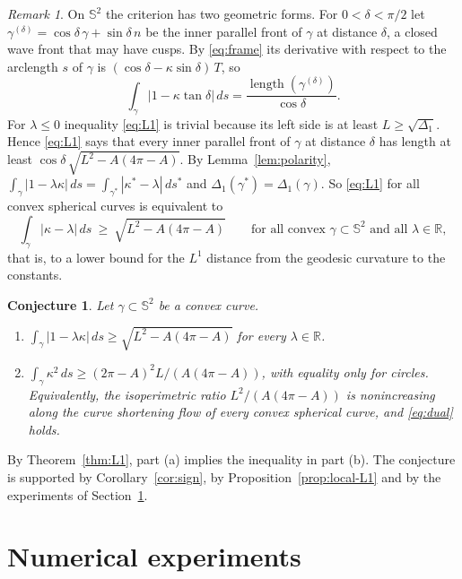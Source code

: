 \documentclass[11pt]{amsart}
\newtheorem{conjecture}[theorem]{Conjecture}
\theoremstyle{definition}
\theoremstyle{remark}
\newtheorem{remark}[theorem]{Remark}
\numberwithin{equation}{section}
\newcommand{\RR}{\mathbb{R}}
\newcommand{\Sph}{\mathbb{S}}
\begin{document}
\begin{remark}\label{rem:fronts}
On $\Sph^2$ the criterion has two geometric forms. For $0<\delta<\pi/2$ let $\gamma^{(\delta)}=\cos\delta\,\gamma+\sin\delta\,n$ be the inner parallel front of $\gamma$ at distance $\delta$, a closed wave front that may have cusps. By \eqref{eq:frame} its derivative with respect to the arclength $s$ of $\gamma$ is $(\cos\delta-\kappa\sin\delta)\,T$, so
\[
\int_\gamma|1-\kappa\tan\delta|\,ds=\frac{\operatorname{length}(\gamma^{(\delta)})}{\cos\delta}.
\]
For $\lambda\le0$ inequality \eqref{eq:L1} is trivial because its left side is at least $L\ge\sqrt{\Delta_1}$. Hence \eqref{eq:L1} says that every inner parallel front of $\gamma$ at distance $\delta$ has length at least $\cos\delta\,\sqrt{L^2-A(4\pi-A)}$. By Lemma~\ref{lem:polarity}, $\int_\gamma|1-\lambda\kappa|\,ds=\int_{\gamma^*}|\kappa^*-\lambda|\,ds^*$ and $\Delta_1(\gamma^*)=\Delta_1(\gamma)$. So \eqref{eq:L1} for all convex spherical curves is equivalent to
\[
\int_\gamma|\kappa-\lambda|\,ds\ \ge\ \sqrt{L^2-A(4\pi-A)}\qquad\text{for all convex }\gamma\subset\Sph^2\text{ and all }\lambda\in\RR,
\]
that is, to a lower bound for the $L^1$ distance from the geodesic curvature to the constants.
\end{remark}

\begin{conjecture}\label{conj:sphere}
Let $\gamma\subset\Sph^2$ be a convex curve.
\begin{enumerate}[label=\textup{(\alph*)}]
\item $\int_\gamma|1-\lambda\kappa|\,ds\ge\sqrt{L^2-A(4\pi-A)}$ for every $\lambda\in\RR$.
\item $\int_\gamma\kappa^2\,ds\ge(2\pi-A)^2L/(A(4\pi-A))$, with equality only for circles. Equivalently, the isoperimetric ratio $L^2/(A(4\pi-A))$ is nonincreasing along the curve shortening flow of every convex spherical curve, and \eqref{eq:dual} holds.
\end{enumerate}
\end{conjecture}

By Theorem~\ref{thm:L1}, part (a) implies the inequality in part (b). The conjecture is supported by Corollary~\ref{cor:sign}, by Proposition~\ref{prop:local-L1} and by the experiments of Section~\ref{sec:numerics}.

\section{Numerical experiments}\label{sec:numerics}
\end{document}
